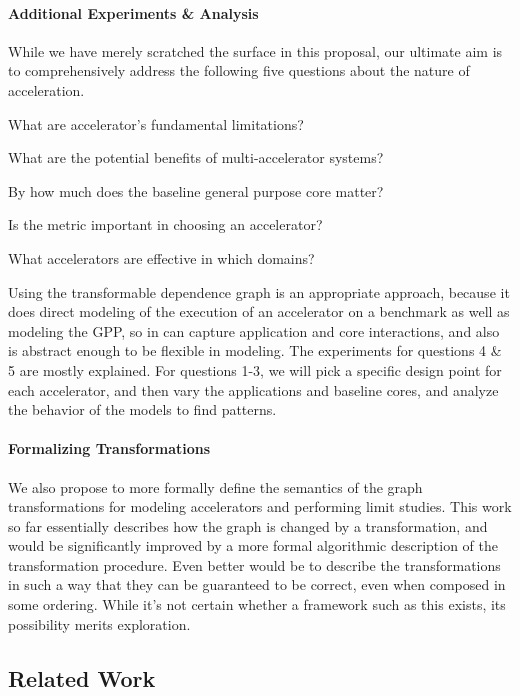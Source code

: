 \paragraph{Additional Experiments \& Analysis}
While we have merely scratched the surface in this proposal, our ultimate aim is
to comprehensively address the following five questions about the nature of acceleration.
\begin{inparaenum}
\item What are accelerator's fundamental limitations?
\item What are the potential benefits of multi-accelerator systems?
\item By how much does the baseline general purpose core matter?
\item Is the metric important in choosing an accelerator? 
\item What accelerators are effective in which domains?
\end{inparaenum}
Using the transformable dependence graph is an appropriate approach, because
it does direct modeling of the execution of an accelerator on a benchmark
as well as modeling the GPP, so in can capture application and core interactions,
and also is abstract enough to be flexible in modeling.  The experiments for
questions 4 \& 5 are mostly explained.  For questions 1-3, we will pick a specific
design point for each accelerator, and then vary the applications and baseline cores,
and analyze the behavior of the models to find patterns.

\paragraph{Formalizing Transformations}
We also propose to more 
formally define the semantics of the graph transformations for modeling 
accelerators and performing limit studies. This work so far essentially 
describes how the graph is changed by a transformation,
and would be significantly improved by a more formal algorithmic description of 
the transformation procedure.  Even better would be to describe the transformations
in such a way that they can be guaranteed to be correct, even when composed in
some ordering.  While it's not certain whether a framework such as this exists,
its possibility merits exploration.


\subsection{Related Work} \label{sec:related}

